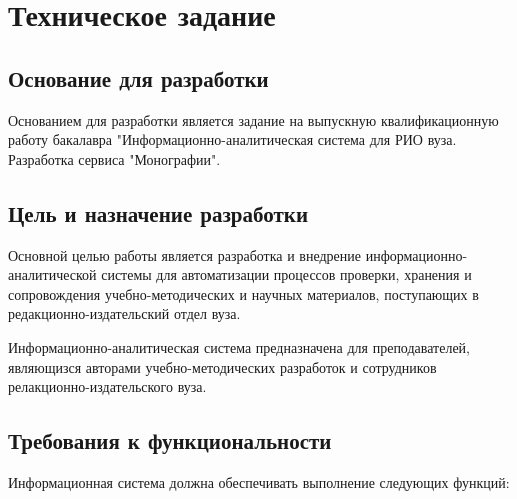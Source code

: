 \section{Техническое задание}

\subsection{Основание для разработки}

Основанием для разработки является задание на выпускную квалификационную работу бакалавра "Информационно-аналитическая система для РИО вуза. Разработка сервиса "Монографии".

\subsection{Цель и назначение разработки}

Основной целью работы является разработка и внедрение информационно-аналитической системы для автоматизации процессов проверки, хранения и сопровождения учебно-методических и научных материалов, поступающих в редакционно-издательский отдел вуза.

Информационно-аналитическая система предназначена для преподавателей, являющизся авторами учебно-методических разработок и сотрудников релакционно-издательского вуза.

\subsection{Требования к функциональности}

Информационная система должна обеспечивать выполнение следующих функций:

